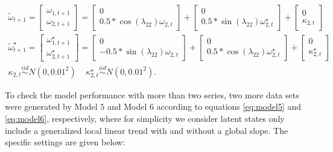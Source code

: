 \documentclass[twoside,11pt]{article}
\begin{document}
\begin{equation} \label{eq:sim-cycle}
\begin{gathered}
\tilde{\omega}_{t+1}=\begin{bmatrix}
\omega_{1,t+1}  \\
\omega_{2,t+1}
\end{bmatrix}=\begin{bmatrix}
0  \\
0.5*\cos(\lambda_{22})\omega_{2,t}
\end{bmatrix}+\begin{bmatrix}
0  \\
0.5*\sin(\lambda_{22})\omega_{2,t}^\star
\end{bmatrix}+\begin{bmatrix}
0  \\
\kappa_{2,t}
\end{bmatrix} \\
\tilde{\omega}_{t+1}^\star=\begin{bmatrix}
\omega_{1,t+1}^\star  \\
\omega_{2,t+1}^\star
\end{bmatrix}=\begin{bmatrix}
0  \\
-0.5*\sin(\lambda_{22})\omega_{2,t}
\end{bmatrix}+\begin{bmatrix}
0  \\
0.5*\cos(\lambda_{22})\omega_{2,t}^\star
\end{bmatrix}+\begin{bmatrix}
0  \\
\kappa_{2,t}^\star
\end{bmatrix}\\
\kappa_{2,t}\stackrel{iid}\sim N(0,0.01^2) \ \ \ \ \
\kappa_{2,t}^\star\stackrel{iid}\sim N(0,0.01^2).
\end{gathered}
\end{equation}



To check the model performance with more than two series, two more data sets were generated by Model $5$ and Model $6$ according to equations \eqref{eq:model5} and \eqref{eq:model6}, respectively, where for simplicity we consider latent states only include a generalized local linear trend with and without a global slope. The specific settings are given below:
\end{document}
